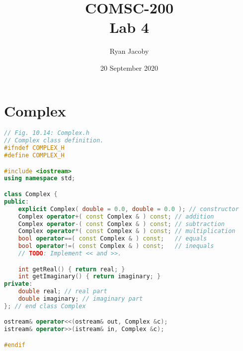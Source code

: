 \documentclass[letterpaper, 11pt]{article}
\title{COMSC-200 \\ Lab 4}
\author{Ryan Jacoby}
\date{20 September 2020}
\begin{document}
\maketitle

\section{Complex}

\begin{lstlisting}[language=c++, caption=Complex.h]
// Fig. 10.14: Complex.h
// Complex class definition.
#ifndef COMPLEX_H
#define COMPLEX_H

#include <iostream>
using namespace std;

class Complex {
public:
    explicit Complex( double = 0.0, double = 0.0 ); // constructor
    Complex operator+( const Complex & ) const; // addition
    Complex operator-( const Complex & ) const; // subtraction
    Complex operator*( const Complex & ) const; // multiplication
    bool operator==( const Complex & ) const;   // equals
    bool operator!=( const Complex & ) const;   // inequals
    // TODO: Implement << and >>.

    int getReal() { return real; }
    int getImaginary() { return imaginary; }
private:
    double real; // real part
    double imaginary; // imaginary part
}; // end class Complex

ostream& operator<<(ostream& out, Complex &c);
istream& operator>>(istream& in, Complex &c);

#endif
\end{lstlisting}
\end{document}

